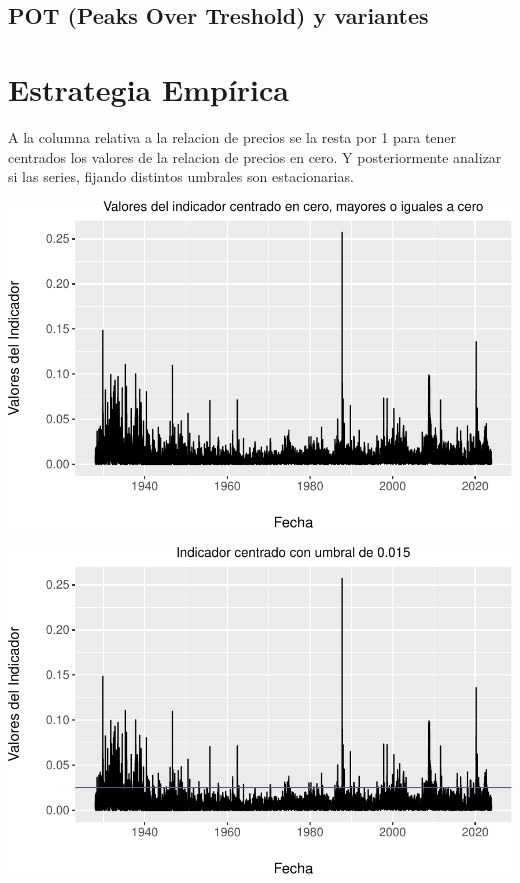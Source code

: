 \documentclass[
  oneside]{article}
\begin{document}
\newpage

\subsection{POT (Peaks Over Treshold) y variantes}

\newpage
\section{Estrategia Empírica}

A la columna relativa a la relacion de precios se la resta por 1 para
tener centrados los valores de la relacion de precios en cero. Y
posteriormente analizar si las series, fijando distintos umbrales son
estacionarias.

\includegraphics{main_files/figure-latex/unnamed-chunk-21-1.pdf}

\includegraphics{main_files/figure-latex/unnamed-chunk-22-1.pdf}
\end{document}
